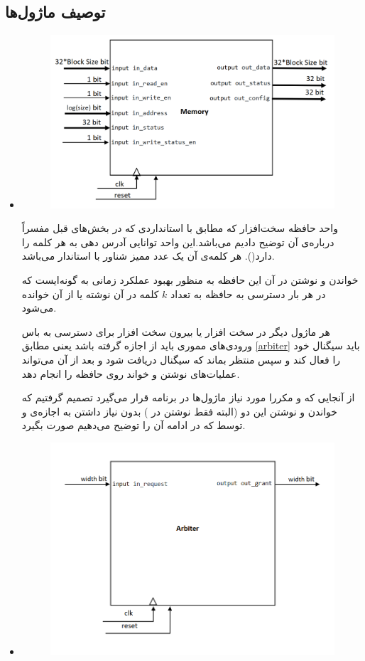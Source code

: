 \documentclass[12pt,onecolumn,a4paper,fleqn]{article}
\begin{document}
\pagebreak
	
\subsection{توصیف ماژول‌ها}

\begin{itemize}
	\item 
	
	\begin{figure}[h]
		\centering
		\includegraphics[width=0.6\linewidth]{source/Memory.png}
		\caption{}
	\end{figure}
	
	واحد حافظه سخت‌افزار که مطابق با استانداردی که در بخش‌های قبل مفسراً درباره‌ی آن توضیح دادیم می‌‌باشد.این واحد توانایی آدرس دهی به هر کلمه‌ را دارد(). هر کلمه‌ی آن یک عدد ممیز شناور با استاندار  می‌باشد.

خواندن و نوشتن در آن این حافظه به منظور بهبود عملکرد زمانی به گونه‌ایست که در هر بار دسترسی به حافظه به تعداد $k$ کلمه در آن نوشته یا از آن خوانده می‌شود.
	
	هر ماژول دیگر در سخت افزار یا بیرون سخت افزار  برای دسترسی به باس ورودی‌های مموری باید از  اجازه گرفته باشد یعنی مطابق \autoref{arbiter} باید سیگنال  خود را فعال کند و سپس منتظر بماند که سیگنال  دریافت شود و بعد از آن می‌تواند عملیات‌های نوشتن و خواند روی حافظه را انجام دهد.
	
	از آنجایی که  و  مکررا مورد نیاز ماژول‌ها در برنامه قرار می‌گیرد تصمیم گرفتیم که خواندن و نوشتن این دو (البته فقط نوشتن در ) بدون نیاز داشتن به اجازه‌ی  و توسط  که در ادامه‌ آن را توضیح می‌دهیم صورت بگیرد.
	\pagebreak
	\item 
	
	\begin{figure}[h]
		\centering
		\includegraphics[width=0.4\linewidth]{source/arbiter1.png}
		\caption{}
	\end{figure}
	

\end{itemize}
\end{document}
